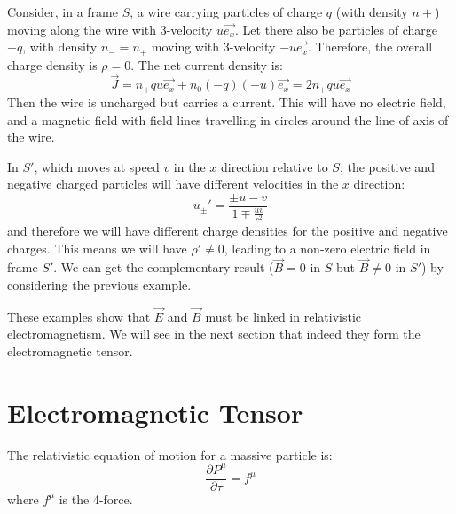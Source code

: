 \documentclass[../Main.tex]{subfiles}
\begin{document}
\begin{example}
    Consider, in a frame $S$, a wire carrying particles of charge $q$ (with density $n+$) moving along the wire with 3-velocity $u\vec{e_x}$. Let there also be particles of charge $-q$, with density $n_- = n_+$ moving with 3-velocity $-u\vec{e_x}$. Therefore, the overall charge density is $\rho = 0$. The net current density is:
    \begin{equation*}
        \vec{J} = n_+ qu\vec{e_x} + n_0 (-q) (-u) \vec{e_x} = 2n_+ q u \vec{e_x}
    \end{equation*}
    Then the wire is uncharged but carries a current. This will have no electric field, and a magnetic field with field lines travelling in circles around the line of axis of the wire.

    In $S'$, which moves at speed $v$ in the $x$ direction relative to $S$, the positive and negative charged particles will have different velocities in the $x$ direction:
    \begin{equation*}
        u_{\pm}' = \frac{\pm u - v}{1 \mp \frac{uv}{c^2}}
    \end{equation*}
    and therefore we will have different charge densities for the positive and negative charges. This means we will have $\rho' \neq 0$, leading to a non-zero electric field in frame $S'$. We can get the complementary result ($\vec{B} = 0$ in $S$ but $\vec{B} \neq 0$ in $S'$) by considering the previous example.
    
    These examples show that $\vec{E}$ and $\vec{B}$ must be linked in relativistic electromagnetism. We will see in the next section that indeed they form the electromagnetic tensor.
\end{example}
\section{Electromagnetic Tensor}
The relativistic equation of motion for a massive particle is:
\begin{equation}
    \frac{\partial P^\mu}{\partial \tau} = f^\mu
    \label{eqnMotionRelativ}
\end{equation}
where $f^\mu$ is the 4-force.
\end{document}
